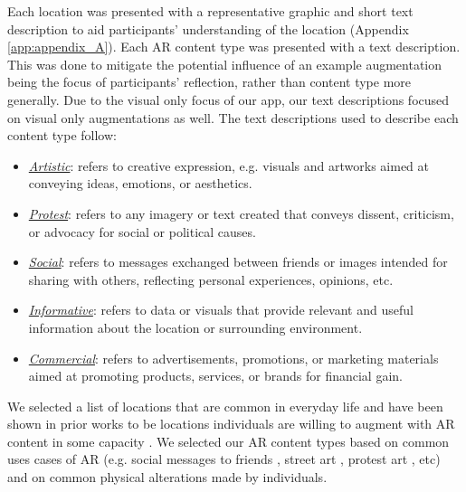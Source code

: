 Each location was presented with a representative graphic and short text description to aid participants' understanding of the location (Appendix \ref{app:appendix_A}). 
Each AR content type was presented with a text description. 
This was done to mitigate the potential influence of an example augmentation being the focus of participants' reflection, rather than content type more generally. 
Due to the visual only focus of our app, our text descriptions focused on visual only augmentations as well. 
The text descriptions used to describe each content type follow: 

\begin{itemize}
    \item \textit{\underline{Artistic}}: refers to creative expression, e.g. visuals and artworks aimed at conveying ideas, emotions, or aesthetics.
    
    \item \textit{\underline{Protest}}: refers to any imagery or text created that conveys dissent, criticism, or advocacy for social or political causes.
    
    \item \textit{\underline{Social}}: refers to messages exchanged between friends or images intended for sharing with others, reflecting personal experiences, opinions, etc.
    
    \item \textit{\underline{Informative}}: refers to data or visuals that provide relevant and useful information about the location or surrounding environment.
    
    \item \textit{\underline{Commercial}}: refers to advertisements, promotions, or marketing materials aimed at promoting products, services, or brands for financial gain.
\end{itemize} 

We selected a list of locations that are common in everyday life and have been shown in prior works to be locations individuals are willing to augment with AR content in some capacity \cite{dig-graf-1, intro_6, imx-church-paper}. 
We selected our AR content types based on common uses cases of AR (e.g. social messages to friends \cite{dig-graf-1}, street art \cite{street-art}, protest art \cite{protestAR}, etc) and on common physical alterations made by individuals. 


